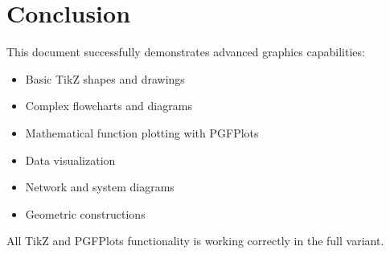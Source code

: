 \documentclass{article}
\begin{document}
\section{Conclusion}
This document successfully demonstrates advanced graphics capabilities:
\begin{itemize}
    \item Basic TikZ shapes and drawings
    \item Complex flowcharts and diagrams
    \item Mathematical function plotting with PGFPlots
    \item Data visualization
    \item Network and system diagrams
    \item Geometric constructions
\end{itemize}

All TikZ and PGFPlots functionality is working correctly in the full variant.
\end{document}
